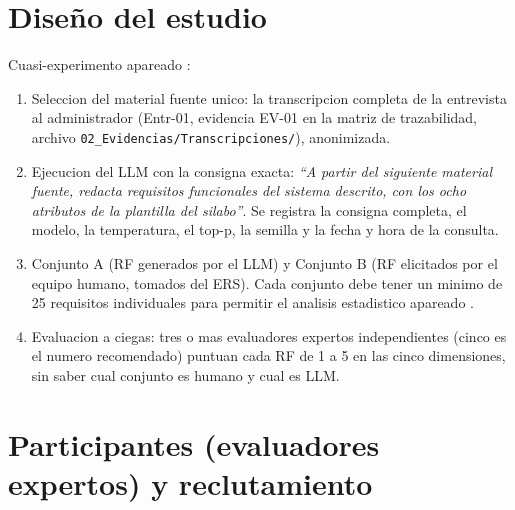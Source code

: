 \documentclass[12pt,a4paper]{article}
\begin{document}
\section{Diseño del estudio}

Cuasi-experimento apareado \cite{wohlin2012}:

\begin{enumerate}
    \item Seleccion del material fuente unico: la transcripcion completa de la
    entrevista al administrador (Entr-01, evidencia EV-01 en la matriz de
    trazabilidad, archivo \texttt{02\_Evidencias/Transcripciones/}), anonimizada.
    \item Ejecucion del LLM con la consigna exacta: \emph{``A partir del
    siguiente material fuente, redacta requisitos funcionales del sistema
    descrito, con los ocho atributos de la plantilla del silabo''}. Se registra
    la consigna completa, el modelo, la temperatura, el top-p, la semilla y la
    fecha y hora de la consulta.
    \item Conjunto A (RF generados por el LLM) y Conjunto B (RF elicitados por
    el equipo humano, tomados del ERS). Cada conjunto debe tener un minimo de
    25 requisitos individuales para permitir el analisis estadistico apareado
    \cite{montgomery2022}.
    \item Evaluacion a ciegas: tres o mas evaluadores expertos independientes
    (cinco es el numero recomendado) puntuan cada RF de 1 a 5 en las cinco
    dimensiones, sin saber cual conjunto es humano y cual es LLM.
\end{enumerate}

\section{Participantes (evaluadores expertos) y reclutamiento}
\end{document}
